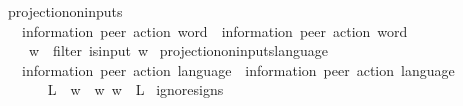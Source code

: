 \begin{isabellebody}
\ projection{\isacharunderscore}{\kern0pt}on{\isacharunderscore}{\kern0pt}inputs\isanewline
\ \ {\isacharcolon}{\kern0pt}{\isacharcolon}{\kern0pt}\ {\isachardoublequoteopen}{\isacharparenleft}{\kern0pt}{\isacharprime}{\kern0pt}information{\isacharcomma}{\kern0pt}\ {\isacharprime}{\kern0pt}peer{\isacharparenright}{\kern0pt}\ action\ word\ {\isasymRightarrow}\ {\isacharparenleft}{\kern0pt}{\isacharprime}{\kern0pt}information{\isacharcomma}{\kern0pt}\ {\isacharprime}{\kern0pt}peer{\isacharparenright}{\kern0pt}\ action\ word{\isachardoublequoteclose}\ \ {\isacharparenleft}{\kern0pt}{\isachardoublequoteopen}{\isacharunderscore}{\kern0pt}{\isasymdown}\isactrlsub {\isacharquery}{\kern0pt}{\isachardoublequoteclose}\ {\isacharbrackleft}{\kern0pt}{}{}{\isacharbrackright}{\kern0pt}\ {}{}{}{\isacharparenright}{\kern0pt}\isanewline
\ \ \isanewline
\ \ \ \ {\isachardoublequoteopen}w{\isasymdown}\isactrlsub {\isacharquery}{\kern0pt}\ {\isasymequiv}\ filter\ is{\isacharunderscore}{\kern0pt}input\ w{\isachardoublequoteclose}\isanewline
\isanewline
{}\isamarkupfalse%
\ projection{\isacharunderscore}{\kern0pt}on{\isacharunderscore}{\kern0pt}inputs{\isacharunderscore}{\kern0pt}language\isanewline
\ \ {\isacharcolon}{\kern0pt}{\isacharcolon}{\kern0pt}\ {\isachardoublequoteopen}{\isacharparenleft}{\kern0pt}{\isacharprime}{\kern0pt}information{\isacharcomma}{\kern0pt}\ {\isacharprime}{\kern0pt}peer{\isacharparenright}{\kern0pt}\ action\ language\ {\isasymRightarrow}\ {\isacharparenleft}{\kern0pt}{\isacharprime}{\kern0pt}information{\isacharcomma}{\kern0pt}\ {\isacharprime}{\kern0pt}peer{\isacharparenright}{\kern0pt}\ action\ language{\isachardoublequoteclose}\isanewline
\ \ {\isacharparenleft}{\kern0pt}{\isachardoublequoteopen}{\isacharunderscore}{\kern0pt}{\isasymdownharpoonright}\isactrlsub {\isacharquery}{\kern0pt}{\isachardoublequoteclose}\ {\isacharbrackleft}{\kern0pt}{}{}{}{\isacharbrackright}{\kern0pt}\ {}{}{}{\isacharparenright}{\kern0pt}\isanewline
\ \ \isanewline
\ \ \ \ {\isachardoublequoteopen}L{\isasymdownharpoonright}\isactrlsub {\isacharquery}{\kern0pt}\ {\isasymequiv}\ {\isacharbraceleft}{\kern0pt}w{\isasymdown}\isactrlsub {\isacharquery}{\kern0pt}\ {\isacharbar}{\kern0pt}\ w{\isachardot}{\kern0pt}\ w\ {\isasymin}\ L{\isacharbraceright}{\kern0pt}{\isachardoublequoteclose}\isanewline
\isanewline
{}\isamarkupfalse%
\ ignore{\isacharunderscore}{\kern0pt}signs\isanewline

\end{isabellebody}
